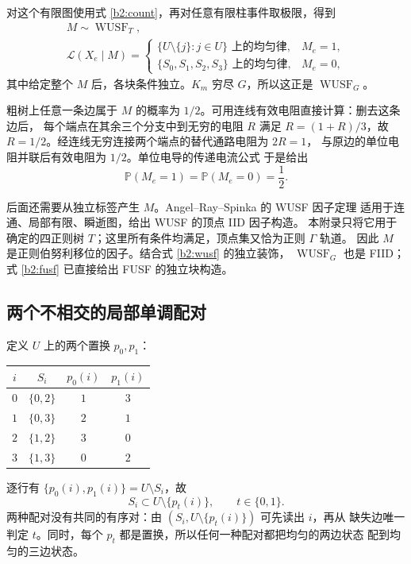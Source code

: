\documentclass[UTF8,zihao=-4,a4paper]{ctexart}
\numberwithin{equation}{section}
\newcommand{\PP}{\mathbb P}
\begin{document}
对这个有限图使用式 \eqref{b2:count}，再对任意有限柱事件取极限，得到
\begin{equation}\label{b2:wusf}
 \begin{gathered}
 M\sim\operatorname{WUSF}_T,\\
 \mathcal L(X_e\mid M)=
 \begin{cases}
  \text{$\{U\setminus\{j\}:j\in U\}$ 上的均匀律},& M_e=1,\\
  \text{$\{S_0,S_1,S_2,S_3\}$ 上的均匀律},& M_e=0,
 \end{cases}
 \end{gathered}
\end{equation}
其中给定整个 $M$ 后，各块条件独立。$K_m$ 穷尽 $G$，所以这正是
$\operatorname{WUSF}_G$。

粗树上任意一条边属于 $M$ 的概率为 $1/2$。可用连线有效电阻直接计算：删去这条边后，
每个端点在其余三个分支中到无穷的电阻 $R$ 满足
$R=(1+R)/3$，故 $R=1/2$。经连线无穷连接两个端点的替代通路电阻为 $2R=1$，
与原边的单位电阻并联后有效电阻为 $1/2$。单位电导的传递电流公式
\cite[\S4, Theorem~7.8]{BLPS}于是给出
\begin{equation}\label{b2:coarsemarginal}
 \PP(M_e=1)=\PP(M_e=0)=\frac12.
\end{equation}

后面还需要从独立标签产生 $M$。Angel--Ray--Spinka 的 WUSF 因子定理
\cite[Theorem~4.1]{ARS}适用于连通、局部有限、瞬逝图，给出 WUSF 的顶点 IID 因子构造。
本附录只将它用于确定的四正则树 $T$；这里所有条件均满足，顶点集又恰为正则 $\Gamma$ 轨道。
因此 $M$ 是正则伯努利移位的因子。结合式 \eqref{b2:wusf} 的独立装饰，
$\operatorname{WUSF}_G$ 也是 FIID；式 \eqref{b2:fusf} 已直接给出 FUSF 的独立块构造。

\subsection{两个不相交的局部单调配对}\label{b2:pairing}

定义 $U$ 上的两个置换 $p_0,p_1$：
\begin{center}
\begin{tabular}{c|c|c|c}
 $i$ & $S_i$ & $p_0(i)$ & $p_1(i)$ \\
 \hline
 $0$ & $\{0,2\}$ & $1$ & $3$ \\
 $1$ & $\{0,3\}$ & $2$ & $1$ \\
 $2$ & $\{1,2\}$ & $3$ & $0$ \\
 $3$ & $\{1,3\}$ & $0$ & $2$
\end{tabular}
\end{center}
逐行有 $\{p_0(i),p_1(i)\}=U\setminus S_i$，故
\begin{equation}\label{b2:match}
 S_i\subset U\setminus\{p_t(i)\},\qquad t\in\{0,1\}.
\end{equation}
两种配对没有共同的有序对：由 $(S_i,U\setminus\{p_t(i)\})$ 可先读出 $i$，再从
缺失边唯一判定 $t$。同时，每个 $p_t$ 都是置换，所以任何一种配对都把均匀的两边状态
配到均匀的三边状态。
\end{document}
